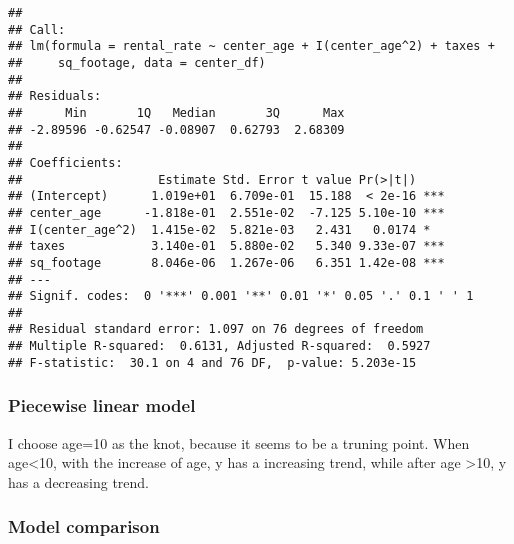 \documentclass[]{article}
\newenvironment{Shaded}{\begin{snugshade}}{\end{snugshade}}
\newcommand{\DataTypeTok}[1]{\textcolor[rgb]{0.13,0.29,0.53}{#1}}
\newcommand{\DecValTok}[1]{\textcolor[rgb]{0.00,0.00,0.81}{#1}}
\newcommand{\KeywordTok}[1]{\textcolor[rgb]{0.13,0.29,0.53}{\textbf{#1}}}
\newcommand{\NormalTok}[1]{#1}
\newcommand{\OperatorTok}[1]{\textcolor[rgb]{0.81,0.36,0.00}{\textbf{#1}}}
\newcommand{\StringTok}[1]{\textcolor[rgb]{0.31,0.60,0.02}{#1}}
\begin{document}
\begin{verbatim}
## 
## Call:
## lm(formula = rental_rate ~ center_age + I(center_age^2) + taxes + 
##     sq_footage, data = center_df)
## 
## Residuals:
##      Min       1Q   Median       3Q      Max 
## -2.89596 -0.62547 -0.08907  0.62793  2.68309 
## 
## Coefficients:
##                   Estimate Std. Error t value Pr(>|t|)    
## (Intercept)      1.019e+01  6.709e-01  15.188  < 2e-16 ***
## center_age      -1.818e-01  2.551e-02  -7.125 5.10e-10 ***
## I(center_age^2)  1.415e-02  5.821e-03   2.431   0.0174 *  
## taxes            3.140e-01  5.880e-02   5.340 9.33e-07 ***
## sq_footage       8.046e-06  1.267e-06   6.351 1.42e-08 ***
## ---
## Signif. codes:  0 '***' 0.001 '**' 0.01 '*' 0.05 '.' 0.1 ' ' 1
## 
## Residual standard error: 1.097 on 76 degrees of freedom
## Multiple R-squared:  0.6131, Adjusted R-squared:  0.5927 
## F-statistic:  30.1 on 4 and 76 DF,  p-value: 5.203e-15
\end{verbatim}

\hypertarget{piecewise-linear-model}{%
\subsubsection{Piecewise linear model}\label{piecewise-linear-model}}

\begin{Shaded}
\end{Shaded}

I choose age=10 as the knot, because it seems to be a truning point.
When age\textless{}10, with the increase of age, y has a increasing
trend, while after age \textgreater{}10, y has a decreasing trend.

\hypertarget{model-comparison}{%
\subsubsection{Model comparison}\label{model-comparison}}
\end{document}
